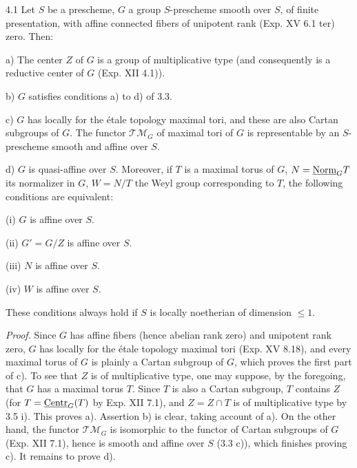 \begin{theorem}{4.1}\label{XVI.4.1}
Let $S$ be a prescheme, $G$ a group $S$-prescheme smooth over $S$, of finite presentation, with affine connected fibers of unipotent rank (Exp. XV 6.1 ter) zero. Then:

\noindent a) The center $Z$ of $G$ is a group of multiplicative type (and consequently is a reductive center of $G$ (Exp. XII 4.1)).

\noindent b) $G$ satisfies conditions a) to d) of 3.3.

\noindent c) $G$ has locally for the étale topology maximal tori, and these are also Cartan subgroups of $G$. The functor $\mathscr{TM}_G$ of maximal tori of $G$ is representable by an $S$-prescheme smooth and affine over $S$.

\noindent d) $G$ is quasi-affine over $S$. Moreover, if $T$ is a maximal torus of $G$, $N=\underline{\mathrm{Norm}}_G T$ its normalizer in $G$, $W=N/T$ the Weyl group corresponding to $T$, the following conditions are equivalent:

\noindent\hspace*{1em}(i) $G$ is affine over $S$.

\noindent\hspace*{1em}(ii) $G'=G/Z$ is affine over $S$.

\noindent\hspace*{1em}(iii) $N$ is affine over $S$.

\noindent\hspace*{1em}(iv) $W$ is affine over $S$.

These conditions always hold if $S$ is locally noetherian of dimension $\leq1$.
\end{theorem}
\par\noindent\emph{Proof.}
Since $G$ has affine fibers (hence abelian rank zero) and unipotent rank zero, $G$ has locally for the étale topology maximal tori (Exp. XV 8.18), and every maximal torus of $G$ is plainly a Cartan subgroup of $G$, which proves the first part of c). To see that $Z$ is of multiplicative type, one may suppose, by the foregoing, that $G$ has a maximal torus $T$. Since $T$ is also a Cartan subgroup, $T$ contains $Z$ (for $T=\underline{\mathrm{Centr}}_G(T)$ by Exp. XII 7.1), and $Z=Z\cap T$ is of multiplicative type by 3.5 i). This proves a). Assertion b) is clear, taking account of a). On the other hand, the functor $\mathscr{TM}_G$ is isomorphic to the functor of Cartan subgroups of $G$ (Exp. XII 7.1), hence is smooth and affine over $S$ (3.3 c)), which finishes proving c). It remains to prove d).

